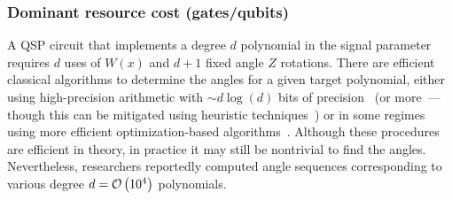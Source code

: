 \begin{refsection}

\subsubsection*{Dominant resource cost (gates/qubits)}
A QSP circuit that implements a degree $d$ polynomial in the signal parameter requires $d$ uses of $W(x)$ and $d+1$ fixed angle $Z$ rotations. There are efficient classical algorithms to determine the angles for a given target polynomial, either using high-precision arithmetic with $\sim d\log(d)$ bits of precision~\cite{haah2018ProdDecPerFuncQSignPRoc} (or more~\cite{gilyen2018QSingValTransf}---though this can be mitigated using heuristic techniques~\cite{chao2020FindingAngleSequences}) or in some regimes using more efficient optimization-based algorithms~\cite{dong2020efficientPhaseFindingInQSP}. Although these procedures are efficient in theory, in practice it may still be nontrivial to find the angles. Nevertheless, researchers reportedly computed angle sequences corresponding to various degree $d = \mathcal{O}\left( 10^4 \right)$ polynomials.




\end{refsection}
